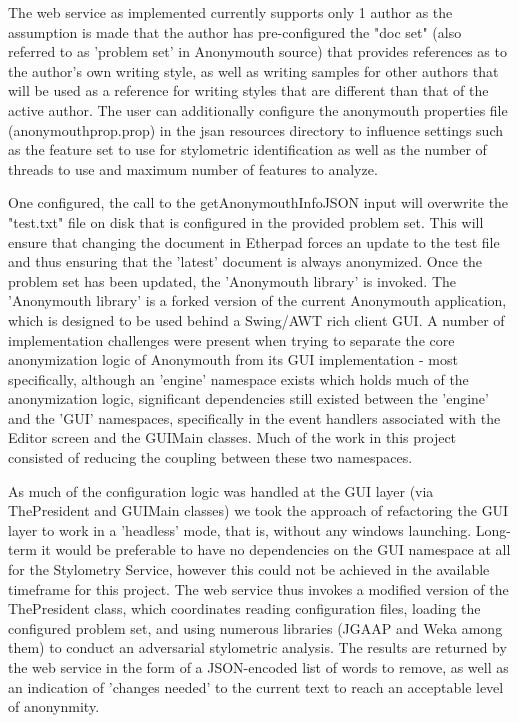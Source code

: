 \documentclass[letterpaper]{article}
\begin{document}
The web service as implemented currently supports only 1 author as the assumption is
made that the author has pre-configured the "doc set" (also referred
to as 'problem set' in Anonymouth source) that provides references as
to the author's own writing style, as well as writing samples for
other authors that will be used as a reference for writing styles that
are different than that of the active author. The user can
additionally configure the anonymouth properties file
(anonymouthprop.prop) in the jsan resources directory to influence
settings such as the feature set to use for stylometric identification
as well as the number of threads to use and maximum number of features
to analyze.

One configured, the call to the getAnonymouthInfoJSON input will
overwrite the "test.txt" file on disk that is configured in the provided problem
set. This will ensure that changing the document in Etherpad forces an
update to the test file and thus ensuring that the 'latest' document
is always anonymized. Once the problem set has been updated, the
'Anonymouth library' is invoked. The 'Anonymouth library' is a forked
version of the current Anonymouth application, which is designed to be
used behind a Swing/AWT rich client GUI. A number of implementation
challenges were present when trying to separate the core anonymization
logic of Anonymouth from its GUI implementation - most specifically,
although an 'engine' namespace exists which holds much of the
anonymization logic, significant dependencies still existed between
the 'engine' and the 'GUI' namespaces, specifically in the event
handlers associated with the Editor screen and the GUIMain classes. Much of the work in this
project consisted of reducing the coupling between these two
namespaces.

As much of the configuration logic was handled at the GUI layer (via
ThePresident and GUIMain classes) we took the approach of refactoring
the GUI layer to work in a 'headless' mode, that is, without any
windows launching. Long-term it would be preferable to have no
dependencies on the GUI namespace at all for the Stylometry Service,
however this could not be achieved in the available timeframe for this
project. The web service thus invokes a modified version of the
ThePresident class, which coordinates reading configuration files,
loading the configured problem set, and using numerous libraries
(JGAAP and Weka among them) to conduct an adversarial stylometric
analysis. The results are returned by the web service in the form of a
JSON-encoded list of words to remove, as well as an indication of
'changes needed' to the current text to reach an acceptable level of
anonynmity.
\end{document}
